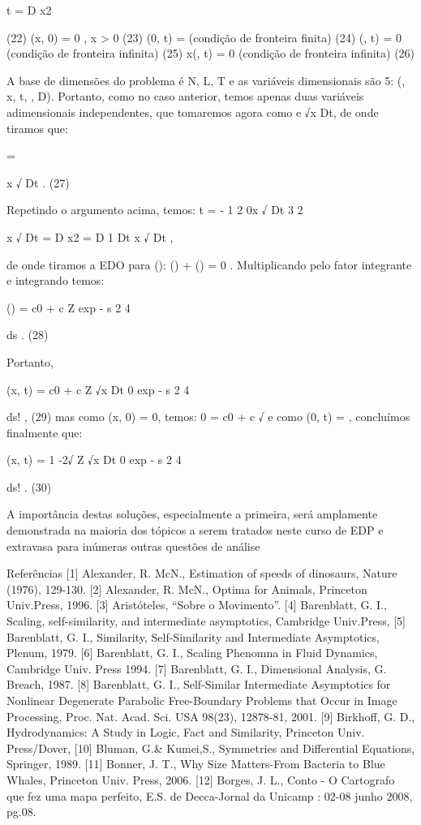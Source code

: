 \partial \rho 
\partial t = D
\rho 
\partial x2

(22)
\rho (x, 0) = 0 , x > 0 (23)
\rho (0, t) =  (condição de fronteira finita) (24)
\rho (\infty , t) = 0 (condição de fronteira infinita) (25)
\partial \rho 
\partial x(\infty , t) = 0 (condição de fronteira infinita) (26)

A base de dimensões do problema é {N, L, T} e as variáveis dimensionais são 5:
(\rho , x, t, , D). Portanto, como no caso anterior, temos apenas duas variáveis adimensionais independentes, que tomaremos agora como \rho 
{}
e √x
Dt, de onde tiramos que:

\rho  = \Phi

x
√
Dt
. (27)

Repetindo o argumento acima, temos:
\partial \rho \partial t = -
1
2
\rho 0x
√
Dt
3
2

x
√
Dt
= D
\rho 
\partial x2
= D
1
Dt
x
√
Dt
,

de onde tiramos a EDO para \Phi(\xi):
(\xi) + 
(\xi) = 0 .
Multiplicando pelo fator integrante e integrando temos:

\Phi(\xi) = c0 + c
Z 
exp 
-
s
2
4

ds . (28)

Portanto,

\rho (x, t) = 
c0 + c
Z √x
Dt
0
exp 
-
s
2
4

ds!
, (29)
mas como \rho (x, 0) = 0, temos: 0 = c0 + c
√
e como \rho (0, t) = , concluímos finalmente que:

\rho (x, t) = 
1 -2√
\pi
Z √x
Dt
0
exp 
-
s
2
4

ds!
. (30)

A importância destas soluções, especialmente a primeira, será amplamente demonstrada na maioria dos tópicos a serem tratados neste curso de EDP e extravasa para inúmeras outras questões de análise

Referências
[1] Alexander, R. McN., Estimation of speeds of dinosaurs, Nature (1976), 129-130.
[2] Alexander, R. McN., Optima for Animals, Princeton Univ.Press, 1996.
[3] Aristóteles, “Sobre o Movimento”.
[4] Barenblatt, G. I., Scaling, self-similarity, and intermediate asymptotics, Cambridge
Univ.Press,
[5] Barenblatt, G. I., Similarity, Self-Similarity and Intermediate Asymptotics, Plenum,
1979.
[6] Barenblatt, G. I., Scaling Phenomna in Fluid Dynamics, Cambridge Univ. Press
1994.
[7] Barenblatt, G. I., Dimensional Analysis, G. Breach, 1987.
[8] Barenblatt, G. I., Self-Similar Intermediate Asymptotics for Nonlinear Degenerate
Parabolic Free-Boundary Problems that Occur in Image Processing, Proc. Nat.
Acad. Sci. USA 98(23), 12878-81, 2001.
[9] Birkhoff, G. D., Hydrodynamics: A Study in Logic, Fact and Similarity, Princeton
Univ. Press/Dover,
[10] Bluman, G.& Kumei,S., Symmetries and Differential Equations, Springer, 1989.
[11] Bonner, J. T., Why Size Matters-From Bacteria to Blue Whales, Princeton Univ.
Press, 2006.
[12] Borges, J. L., Conto - O Cartografo que fez uma mapa perfeito, E.S. de Decca-Jornal
da Unicamp : 02-08 junho 2008, pg.08.

